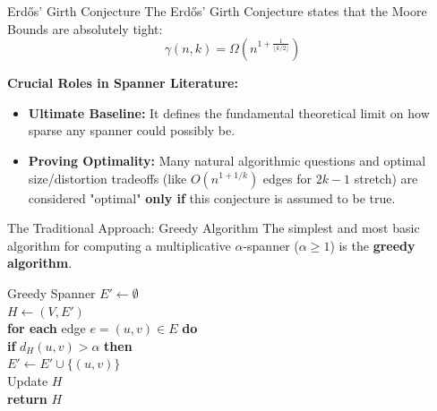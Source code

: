 \documentclass{beamer}
\begin{document}
\begin{frame}{Erdős' Girth Conjecture}
    The Erdős' Girth Conjecture states that the Moore Bounds are absolutely tight:
    \[ \gamma(n,k) = \Omega\left(n^{1 + \frac{1}{\lfloor k/2 \rfloor}}\right) \]
    
    \vspace{0.4cm}
    \textbf{Crucial Roles in Spanner Literature:}
    \begin{itemize}
        \item \textbf{Ultimate Baseline:} It defines the fundamental theoretical limit on how sparse any spanner could possibly be.
        \vspace{0.2cm}
        \item \textbf{Proving Optimality:} Many natural algorithmic questions and optimal size/distortion tradeoffs (like $O(n^{1+1/k})$ edges for $2k-1$ stretch) are considered "optimal" \textbf{only if} this conjecture is assumed to be true.
    \end{itemize}
\end{frame}

\begin{frame}{The Traditional Approach: Greedy Algorithm}
    The simplest and most basic algorithm for computing a multiplicative $\alpha$-spanner ($\alpha \ge 1$) is the \textbf{greedy algorithm}.
    
    \vspace{0.4cm}
    \begin{block}{Greedy Spanner}
        $E' \gets \emptyset$ \\
        $H \gets (V, E')$ \\
        \textbf{for each} edge $e = (u,v) \in E$ \textbf{do} \\
        \hspace{0.5cm} \textbf{if} $d_H(u,v) > \alpha$ \textbf{then} \\
        \hspace{1.0cm} $E' \gets E' \cup \{(u,v)\}$ \\
        \hspace{1.0cm} Update $H$ \\
        \textbf{return} $H$
    \end{block}
\end{frame}
\end{document}

